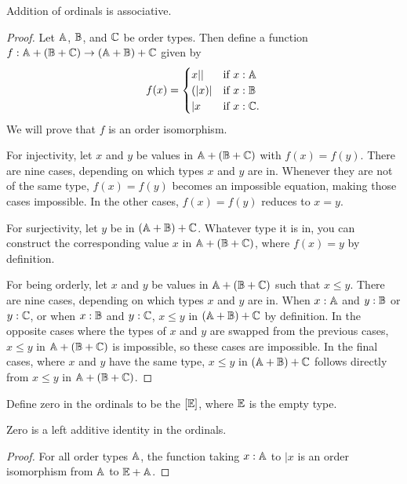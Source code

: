 \documentclass[../../math.tex]{subfiles}
\begin{document}
\begin{instance}
    Addition of ordinals is associative.
\end{instance}
\begin{proof}
    Let $\mathbb{A}$, $\mathbb{B}$, and $\mathbb{C}$ be order types.  Then define a function $f : \mathbb{A} +
    (\mathbb{B} + \mathbb{C}) \to (\mathbb{A} + \mathbb{B}) + \mathbb{C}$ given by
    \[
        f(x) =
        \begin{cases}
            x|| &\text{if $x : \mathbb{A}$} \\
            (|x)| &\text{if $x : \mathbb{B}$} \\
            |x &\text{if $x : \mathbb{C}$.}
        \end{cases}
    \]
    We will prove that $f$ is an order isomorphism.

    For injectivity, let $x$ and $y$ be values in $\mathbb{A} + (\mathbb{B} + \mathbb{C})$ with $f(x) =
    f(y)$.  There are nine cases, depending on which types $x$ and $y$ are in.
    Whenever they are not of the same type, $f(x) = f(y)$ becomes an impossible
    equation, making those cases impossible.  In the other cases, $f(x) = f(y)$
    reduces to $x = y$.

    For surjectivity, let $y$ be in $(\mathbb{A} + \mathbb{B}) + \mathbb{C}$.  Whatever type it is in,
    you can construct the corresponding value $x$ in $\mathbb{A} + (\mathbb{B} + \mathbb{C})$, where
    $f(x) = y$ by definition.

    For being orderly, let $x$ and $y$ be values in $\mathbb{A} + (\mathbb{B} + \mathbb{C})$ such that
    $x \leq y$.  There are nine cases, depending on which types $x$ and $y$ are
    in.  When $x : \mathbb{A}$ and $y : \mathbb{B}$ or $y : \mathbb{C}$, or when $x : \mathbb{B}$ and $y : \mathbb{C}$,
    $x \leq y$ in $(\mathbb{A} + \mathbb{B}) + \mathbb{C}$ by definition.  In the opposite cases where
    the types of $x$ and $y$ are swapped from the previous cases, $x \leq y$ in
    $\mathbb{A} + (\mathbb{B} + \mathbb{C})$ is impossible, so these cases are impossible.  In the final
    cases, where $x$ and $y$ have the same type, $x \leq y$ in $(\mathbb{A} + \mathbb{B}) + \mathbb{C}$
    follows directly from $x \leq y$ in $\mathbb{A} + (\mathbb{B} + \mathbb{C})$.
\end{proof}

\begin{instance}
    Define zero in the ordinals to be the $[\mathbb{E}]$, where $\mathbb{E}$ is the empty type.
\end{instance}

\begin{instance}
    Zero is a left additive identity in the ordinals.
\end{instance}
\begin{proof}
    For all order types $\mathbb{A}$, the function taking $x : \mathbb{A}$ to $|x$ is an order
    isomorphism from $\mathbb{A}$ to $\mathbb{E} + \mathbb{A}$.
\end{proof}
\end{document}
